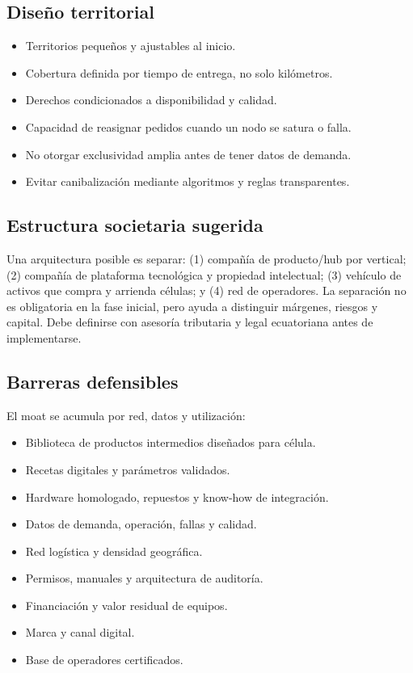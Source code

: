 \documentclass[11pt,a4paper]{article}
\begin{document}
\subsection{Diseño territorial}
\begin{itemize}
\item Territorios pequeños y ajustables al inicio.
\item Cobertura definida por tiempo de entrega, no solo kilómetros.
\item Derechos condicionados a disponibilidad y calidad.
\item Capacidad de reasignar pedidos cuando un nodo se satura o falla.
\item No otorgar exclusividad amplia antes de tener datos de demanda.
\item Evitar canibalización mediante algoritmos y reglas transparentes.
\end{itemize}

\subsection{Estructura societaria sugerida}
Una arquitectura posible es separar: (1) compañía de producto/hub por vertical; (2) compañía de
plataforma tecnológica y propiedad intelectual; (3) vehículo de activos que compra y arrienda células; y
(4) red de operadores. La separación no es obligatoria en la fase inicial, pero ayuda a distinguir
márgenes, riesgos y capital. Debe definirse con asesoría tributaria y legal ecuatoriana antes de
implementarse.

\subsection{Barreras defensibles}
El moat se acumula por red, datos y utilización:
\begin{itemize}
\item Biblioteca de productos intermedios diseñados para célula.
\item Recetas digitales y parámetros validados.
\item Hardware homologado, repuestos y know-how de integración.
\item Datos de demanda, operación, fallas y calidad.
\item Red logística y densidad geográfica.
\item Permisos, manuales y arquitectura de auditoría.
\item Financiación y valor residual de equipos.
\item Marca y canal digital.
\item Base de operadores certificados.
\end{itemize}
\end{document}
